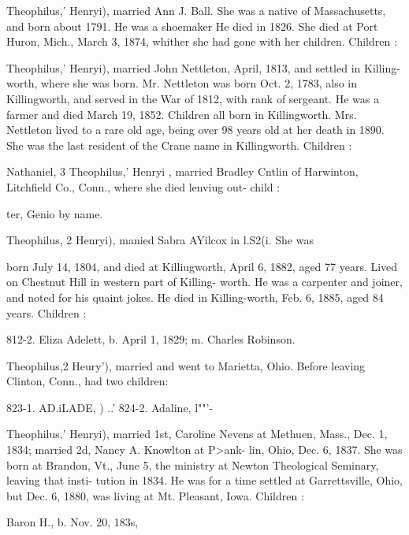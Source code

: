 \documentclass[oneside]{book}
\begin{document}
Theophilus,' Henryi), married Ann J. Ball. She was a native 
of Massachusetts, and born about 1791. He was a shoemaker 
He died in 1826. She died at Port Huron, Mich., March 3, 
1874, whither she had gone with her children. Children : 


Theophilus,' Henryi), married John Nettleton, April, 1813, and 
settled in Killing-worth, where she was born. Mr. Nettleton was 
born Oct. 2, 1783, also in Killingworth, and served in the War 
of 1812, with rank of sergeant. He was a farmer and died 
March 19, 1852. Children all born in Killingworth. Mrs. 
Nettleton lived to a rare old age, being over 98 years old at her 
death in 1890. She was the last resident of the Crane name in 
Killingworth. Children : 





Nathaniel, 3 Theophilus,' Henryi , married Bradley Cntlin of 
Harwinton, Litchfield Co., Conn., where she died lenviug out- 
child : 

ter, Genio by name. 

Theophilus, 2 Henryi), manied Sabra AYilcox in l.S2(i. She was 




born July 14, 1804, and died at Killiugworth, April 6, 1882, 
aged 77 years. Lived on Chestnut Hill in western part of Killing- 
worth. He was a carpenter and joiner, and noted for his quaint 
jokes. He died in Killing-worth, Feb. 6, 1885, aged 84 years. 
Children : 


812-2. Eliza Adelett, b. April 1, 1829; m. Charles Robinson. 










Theophilus,2 Heury'), married and went to Marietta, Ohio. 
Before leaving Clinton, Conn., had two children: 

823-1. AD.iLADE, ) ..' 
824-2. Adaline, l""'- 

Theophilus,' Henryi), married 1st, Caroline Nevens at Methuen, 
Mass., Dec. 1, 1834; married 2d, Nancy A. Knowlton at P>ank- 
lin, Ohio, Dec. 6, 1837. She was born at Brandon, Vt., June 5, 
the ministry at Newton Theological Seminary, leaving that insti- 
tution in 1834. He was for a time settled at Garrettsville, Ohio, 
but Dec. 6, 1880, was living at Mt. Pleasant, Iowa. Children : 





Baron H., b. Nov. 20, 183s, 
\end{document}
